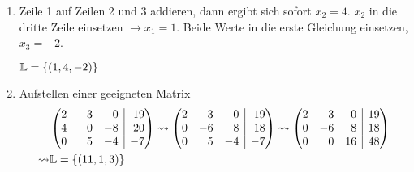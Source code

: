 \begin{lsg}{}
\begin{enumerate}
	\item Zeile 1 auf Zeilen 2 und 3 addieren, dann ergibt sich sofort $x_2=4$. $x_2$ in die dritte Zeile einsetzen $\rightarrow x_1=1$. Beide Werte in die erste Gleichung einsetzen, $x_3=-2$.

	$\mathbb{L}=\left\{ (1,4,-2) \right\}$
	\item Aufstellen einer geeigneten Matrix
	\begin{align*}
		&\ematrix{rrr|r}{2&-3&0&19\\4&0&-8&20\\0&5&-4&-7}
		\rightsquigarrow\ematrix{rrr|r}{2&-3&0&19\\0&-6&8&18\\0&5&-4&-7}\rightsquigarrow\ematrix{rrr|r}{2&-3&0&19\\0&-6&8&18\\0&0&16&48}\\
		\rightsquigarrow&\mathbb{L}=\simpleset{(11,1,3)}
	\end{align*}
\end{enumerate}
\end{lsg}


